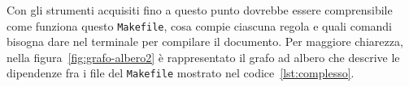 Con gli strumenti acquisiti fino a questo punto dovrebbe essere comprensibile
come funziona questo \texttt{Makefile}, cosa compie ciascuna regola e quali
comandi bisogna dare nel terminale per compilare il documento.  Per maggiore
chiarezza, nella figura~\ref{fig:grafo-albero2} è rappresentato il grafo ad
albero che descrive le dipendenze fra i file del \texttt{Makefile} mostrato nel
codice~\ref{lst:complesso}.

